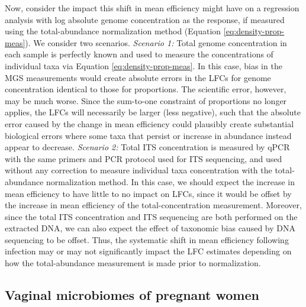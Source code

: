 \documentclass[
]{article}
\begin{document}
Now, consider the impact this shift in mean efficiency might have on a regression analysis with log absolute genome concentration as the response, if measured using the total-abundance normalization method (Equation \eqref{eq:density-prop-meas}).
We consider two scenarios.
\emph{Scenario 1:} Total genome concentration in each sample is perfectly known and used to measure the concentrations of individual taxa via Equation \eqref{eq:density-prop-meas}.
In this case, bias in the MGS measurements would create absolute errors in the LFCs for genome concentration identical to those for proportions.
The scientific error, however, may be much worse.
Since the sum-to-one constraint of proportions no longer applies, the LFCs will necessarily be larger (less negative), such that the absolute error caused by the change in mean efficiency could plausibly create substantial biological errors where some taxa that persist or increase in abundance instead appear to decrease.
\emph{Scenario 2:} Total ITS concentration is measured by qPCR with the same primers and PCR protocol used for ITS sequencing, and used without any correction to measure individual taxa concentration with the total-abundance normalization method.
In this case, we should expect the increase in mean efficiency to have little to no impact on LFCs, since it would be offset by the increase in mean efficiency of the total-concentration measurement.
Moreover, since the total ITS concentration and ITS sequencing are both performed on the extracted DNA, we can also expect the effect of taxonomic bias caused by DNA sequencing to be offset.
Thus, the systematic shift in mean efficiency following infection may or may not significantly impact the LFC estimates depending on how the total-abundance measurement is made prior to normalization.

\hypertarget{vaginal-microbiomes-of-pregnant-women}{%
\subsection{Vaginal microbiomes of pregnant women}\label{vaginal-microbiomes-of-pregnant-women}}
\end{document}
